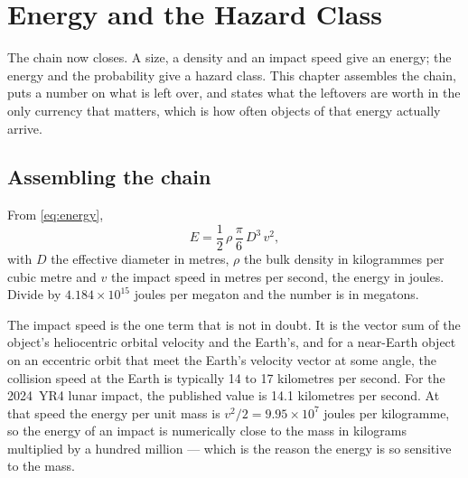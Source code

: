 
\chapter{Energy and the Hazard Class}
\label{ch:energy}

The chain now closes. A size, a density and an impact speed give an energy;
the energy and the probability give a hazard class. This chapter assembles
the chain, puts a number on what is left over, and states what the leftovers
are worth in the only currency that matters, which is how often objects of
that energy actually arrive.

\section{Assembling the chain}

From \eqref{eq:energy},
\begin{equation}
E = \frac{1}{2}\,\rho\,\frac{\pi}{6}\,D^{3}\,v^{2},
\label{eq:energy2}
\end{equation}
with \(D\) the effective diameter in metres, \(\rho\) the bulk density in
kilogrammes per cubic metre and \(v\) the impact speed in metres per second,
the energy in joules. Divide by \(4.184\times 10^{15}\) joules per megaton
and the number is in megatons.

The impact speed is the one term that is not in doubt. It is the vector sum
of the object's heliocentric orbital velocity and the Earth's, and for a
near-Earth object on an eccentric orbit that meet the Earth's velocity
vector at some angle, the collision speed at the Earth is typically 14 to 17
kilometres per second. For the 2024~YR4 lunar impact, the published value is
14.1 kilometres per second. At that speed the energy per unit mass is
\(v^{2}/2 = 9.95\times 10^{7}\) joules per kilogramme, so the energy of an
impact is numerically close to the mass in kilograms multiplied by a hundred
million --- which is the reason the energy is so sensitive to the mass.

